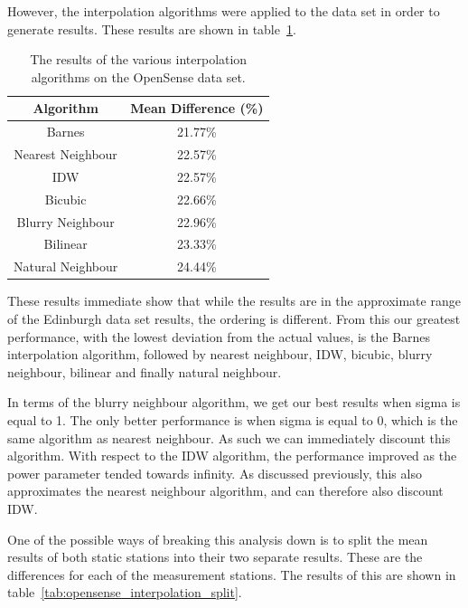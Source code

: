 
			However, the interpolation algorithms were applied to the data set in order to generate results. These results are shown in table~\ref{tab:opensense_interpolation_results}.

			\begin{table}
				\centering
	    		\begin{tabular}{|c|c|}
	    			\hline
					Algorithm & Mean Difference (\%) \\ \hline
					Barnes & 21.77\% \\
					Nearest Neighbour & 22.57\% \\
					IDW & 22.57\% \\
					Bicubic & 22.66\% \\
					Blurry Neighbour & 22.96\% \\
					Bilinear & 23.33\% \\
					Natural Neighbour & 24.44\% \\
					\hline
				\end{tabular}
				\caption{The results of the various interpolation algorithms on the OpenSense data set.}
				\label{tab:opensense_interpolation_results}
			\end{table} 

			These results immediate show that while the results are in the approximate range of the Edinburgh data set results, the ordering is different. From this our greatest performance, with the lowest deviation from the actual values, is the Barnes interpolation algorithm, followed by nearest neighbour, IDW, bicubic, blurry neighbour, bilinear and finally natural neighbour. 

			In terms of the blurry neighbour algorithm, we get our best results when sigma is equal to 1. The only better performance is when sigma is equal to 0, which is the same algorithm as nearest neighbour. As such we can immediately discount this algorithm. With respect to the IDW algorithm, the performance improved as the power parameter tended towards infinity. As discussed previously, this also approximates the nearest neighbour algorithm, and can therefore also discount IDW.

			One of the possible ways of breaking this analysis down is to split the mean results of both static stations into their two separate results. These are the differences for each of the measurement stations. The results of this are shown in table~\ref{tab:opensense_interpolation_split}.

